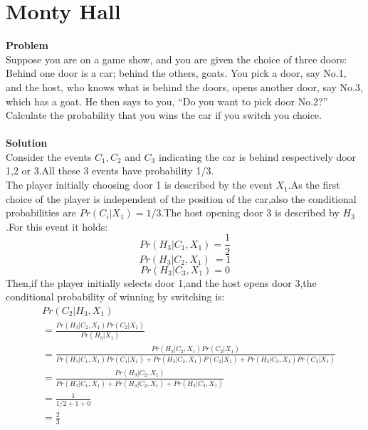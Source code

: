 	\section{Monty Hall}
	\textbf{Problem}\\
	Suppose you are on a game show, and you are given the choice of three doors: Behind one door is a car; behind the others, goats. You pick a door, say No.1, and the host, who knows what is behind the doors, opens another door, say No.3, which has a goat. He then says to you, ``Do you want to pick door No.2?'' Calculate the probability that you wins the car if you switch you choice.\\\\
	\textbf{Solution}\\
	Consider the events $C_1,C_2$ and $C_3$ indicating the car is behind respectively door 1,2 or 3.All these 3 events have probability 1/3.\\
	The player initially choosing door 1 is described by the event $X_1$.As the first choice of the player is independent of the position of the car,also the conditional probabilities are $Pr(C_i|X_1)=1/3$.The host opening door 3 is described by $H_3$.For this event it holds:
	\[Pr(H_3|C_1,X_1) = \frac{1}{2}\]
	\[Pr(H_3|C_2,X_1)\ = 1\]
	\[Pr(H_3|C_3,X_1) = 0\]
	Then,if the player initially selects door 1,and the host opens door 3,the conditional probability of winning by switching is:
	\[
		\begin{aligned}
			&Pr(C_2|H_3,X_1)\\
			&=\frac{Pr(H_3|C_2,X_1)Pr(C_2|X_1)}{Pr(H_3|X_1)}\\
			&=\frac{Pr(H_3|C_2,X_1)Pr(C_2|X_1)}{Pr(H_3|C_1,X_1)Pr(C_1|X_1)+Pr(H_3|C_2,X_1)P(C_2|X_1)+Pr(H_3|C_3,X_1)Pr(C_3|X_1)}\\
			&=\frac{Pr(H_3|C_2,X_1)}{Pr(H_3|C_1,X_1)+Pr(H_3|C_2,X_1)+Pr(H_3|C_3,X_1)}\\
			&=\frac{1}{1/2+1+0}\\
			&=\frac{2}{3}
		\end{aligned}
	\]
	
